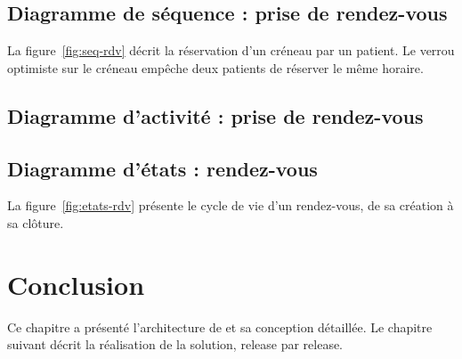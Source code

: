 \subsection{Diagramme de séquence : prise de rendez-vous}
La figure~\ref{fig:seq-rdv} décrit la réservation d'un créneau par un patient. Le verrou optimiste sur le créneau empêche deux patients de réserver le même horaire.


\subsection{Diagramme d'activité : prise de rendez-vous}

\subsection{Diagramme d'états : rendez-vous}
La figure~\ref{fig:etats-rdv} présente le cycle de vie d'un rendez-vous, de sa création à sa clôture.


\section*{Conclusion}
Ce chapitre a présenté l'architecture de \nomprojet{} et sa conception détaillée. Le chapitre suivant décrit la réalisation de la solution, release par release.
